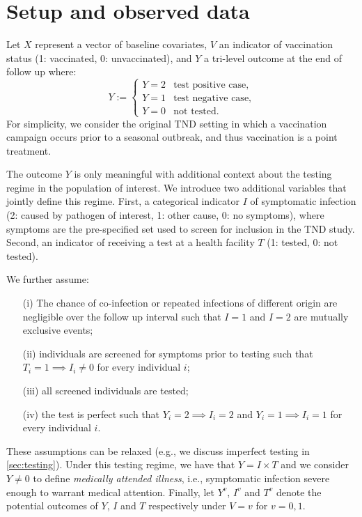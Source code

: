 \documentclass[11pt]{article}
\begin{document}
\section*{Setup and observed data} \label{sec:setup}
Let $X$ represent a vector of baseline covariates, $V$ an indicator of vaccination status (1: vaccinated, 0: unvaccinated), and $Y$ a tri-level outcome at the end of follow up where:
$$Y:= \begin{cases}
    Y = 2 & \text{test positive case}, \\
    Y = 1 & \text{test negative case}, \\
    Y = 0 & \text{not tested}.
\end{cases}
$$
For simplicity, we consider the original TND setting in which a vaccination campaign occurs prior to a seasonal outbreak, and thus vaccination is a point treatment. 

The outcome $Y$ is only meaningful with additional context about the testing regime in the population of interest. We introduce two additional variables that jointly define this regime. First, a categorical indicator $I$ of symptomatic infection (2: caused by pathogen of interest, 1: other cause, 0: no symptoms), where symptoms are the pre-specified set used to screen for inclusion in the TND study. Second, an indicator of receiving a test at a health facility $T$ (1: tested, 0: not tested). 

We further assume:
\begin{enumerate}
    \item[(i)] The chance of co-infection or repeated infections of different origin are negligible over the follow up interval such that $I = 1$ and $I = 2$ are mutually exclusive events;
    \item[(ii)] individuals are screened for symptoms prior to testing such that $T_i = 1 \implies I_i \neq 0$ for every individual $i$;
    \item[(iii)] all screened individuals are tested;
    \item[(iv)] the test is perfect such that $Y_i = 2 \implies I_i = 2$ and $Y_i = 1 \implies I_i = 1$ for every individual $i$.
\end{enumerate}
These assumptions can be relaxed (e.g., we discuss imperfect testing in \ref{sec:testing}). Under this testing regime, we have that $Y = I \times T$  and we consider $Y \neq 0$ to define \textit{medically attended illness}, i.e., symptomatic infection severe enough to warrant medical attention. Finally, let $Y^v$, $I^v$ and $T^v$ denote the potential outcomes of $Y$, $I$ and $T$ respectively under $V=v$ for $v=0,1$. 
\end{document}
